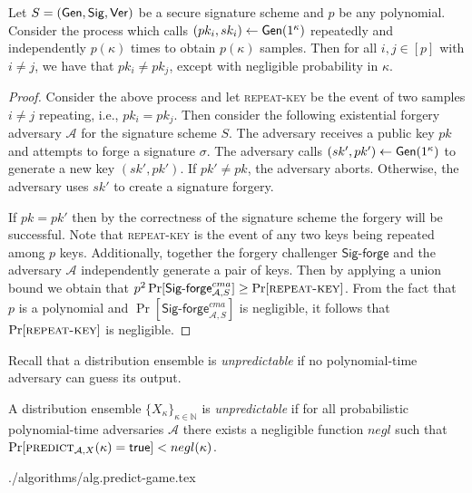 \begin{lemma}\label{lem:distinct-keys}
  Let $S = (\mathsf{Gen}, \mathsf{Sig}, \mathsf{Ver})$ be a secure signature scheme and $p$ be any polynomial. Consider the process which calls $(pk_i, sk_i) \gets \mathsf{Gen}(1^\kappa)$ repeatedly and independently $p(\kappa)$ times to obtain $p(\kappa)$ samples. Then for all $i, j \in [p]$ with $i \neq j$, we have that $pk_i \neq pk_j$, except with negligible probability in $\kappa$.
\end{lemma}
\begin{proof}
  Consider the above process and let \textsc{repeat-key} be the event of two samples $i \neq j$ repeating, i.e., $pk_i = pk_j$. Then consider the following existential forgery adversary $\mathcal{A}$ for the signature scheme $S$. The adversary receives a public key $pk$ and attempts to forge a signature $\sigma$. The adversary calls $(sk', pk') \gets \mathsf{Gen}(1^\kappa)$ to generate a new key $(sk', pk')$. If $pk' \neq pk$, the adversary aborts. Otherwise, the adversary uses $sk'$ to create a signature forgery.

  If $pk = pk'$ then by the correctness of the signature scheme the forgery will be successful. Note that \textsc{repeat-key} is the event of any two keys being repeated among $p$ keys. Additionally, together the forgery challenger $\textsf{Sig-forge}$ and the adversary $\mathcal{A}$ independently generate a pair of keys. Then by applying a union bound we obtain that $p^2 \Pr[\textsf{Sig-forge}^{cma}_{\mathcal{A},S}] \geq \Pr[\textsc{repeat-key}]$. From the fact that $p$ is a polynomial and
  $\Pr[\textsf{Sig-forge}^{cma}_{\mathcal{A},S}]$ is negligible, it follows that $\Pr[\textsc{repeat-key}]$ is negligible.
\end{proof}

Recall that a distribution ensemble is \emph{unpredictable} if no
polynomial-time adversary can guess its output.

\begin{definition}
  A distribution ensemble $\{X_{\kappa}\}_{\kappa\in\mathbb{N}}$ is
  \emph{unpredictable} if for all probabilistic polynomial-time adversaries
  $\mathcal{A}$ there exists a negligible function $negl$ such that
  $\Pr[\textsc{predict}_{\mathcal{A},X}(\kappa) = \mathsf{true}] < negl(\kappa)$.
\end{definition}

{./algorithms/alg.predict-game.tex}

